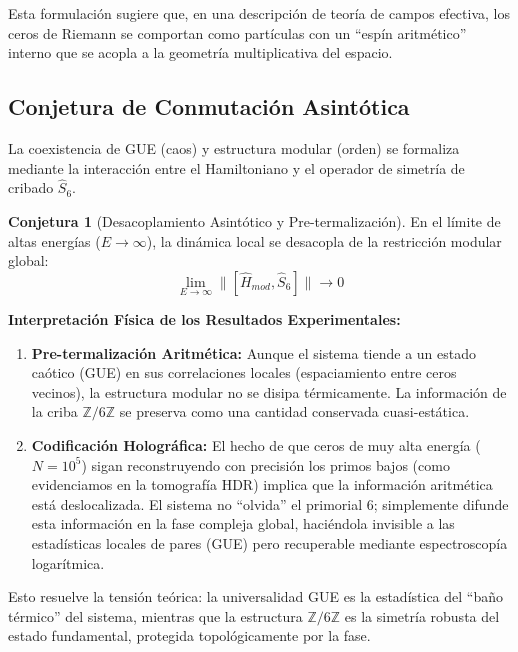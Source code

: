 \documentclass[12pt, a4paper]{article}
\theoremstyle{plain}
\theoremstyle{definition}
\newtheorem{conjetura}[teorema]{Conjetura}
\newcommand{\Z}{\mathbb{Z}}
\begin{document}
Esta formulación sugiere que, en una descripción de teoría de campos efectiva, los ceros de Riemann se comportan como partículas con un ``espín aritmético'' interno que se acopla a la geometría multiplicativa del espacio.

\subsection{Conjetura de Conmutación Asintótica}

La coexistencia de GUE (caos) y estructura modular (orden) se formaliza mediante la interacción entre el Hamiltoniano y el operador de simetría de cribado $\hat{S}_6$.

\begin{conjetura}[Desacoplamiento Asintótico y Pre-termalización]
En el límite de altas energías ($E \to \infty$), la dinámica local se desacopla de la restricción modular global:
\begin{equation}
    \lim_{E \to \infty} \| [\hat{H}_{mod}, \hat{S}_6] \| \to 0
\end{equation}
\end{conjetura}

\textbf{Interpretación Física de los Resultados Experimentales:}
\begin{enumerate}
    \item \textbf{Pre-termalización Aritmética:} Aunque el sistema tiende a un estado caótico (GUE) en sus correlaciones locales (espaciamiento entre ceros vecinos), la estructura modular no se disipa térmicamente. La información de la criba $\Z/6\Z$ se preserva como una cantidad conservada cuasi-estática.
    \item \textbf{Codificación Holográfica:} El hecho de que ceros de muy alta energía ($N=10^5$) sigan reconstruyendo con precisión los primos bajos (como evidenciamos en la tomografía HDR) implica que la información aritmética está deslocalizada. El sistema no ``olvida'' el primorial 6; simplemente difunde esta información en la fase compleja global, haciéndola invisible a las estadísticas locales de pares (GUE) pero recuperable mediante espectroscopía logarítmica.
\end{enumerate}

Esto resuelve la tensión teórica: la universalidad GUE es la estadística del ``baño térmico'' del sistema, mientras que la estructura $\Z/6\Z$ es la simetría robusta del estado fundamental, protegida topológicamente por la fase.

\end{document}
